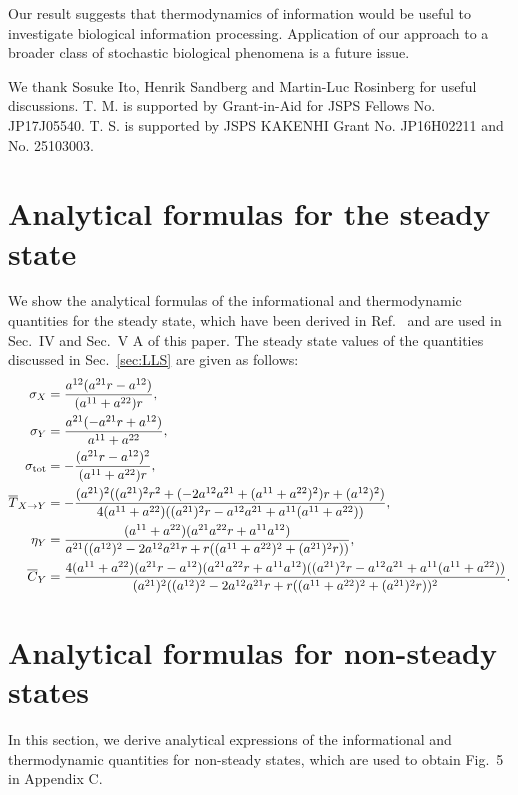 \documentclass[%
 reprint,
 amsmath,amssymb,
 aps,
]{revtex4-1}
\newcommand{\balign}[1]{\begin{align} #1 \end{align}}
\newcommand\str{\overline{T}_{X\to Y}}
\theoremstyle{plain}
\begin{document}
Our result suggests that thermodynamics of information would be useful to investigate biological information processing.  Application of our approach to a broader class of stochastic biological phenomena is a future issue.

\begin{acknowledgments}
We thank Sosuke Ito, Henrik Sandberg and Martin-Luc Rosinberg for useful discussions. T. M. is supported by Grant-in-Aid for JSPS Fellows No. JP17J05540. T. S. is supported by JSPS KAKENHI Grant No. JP16H02211 and No. 25103003.  

\end{acknowledgments}

\appendix


\section{Analytical formulas for the steady state}\label{sec:Sm}
\begin{widetext}
We show the analytical formulas of the informational and thermodynamic quantities for the steady state, which have been derived in Ref.~\cite{Hartich2016} and are used in Sec.~IV and Sec.~V A of this paper. The steady state values of the quantities discussed in Sec.~\ref{sec:LLS} are given as follows:
\balign{
\sigma_{X}&=\frac{a^{12}(a^{21} r-a^{12})}{(a^{11}+a^{22})r}, \label{eq:sigmaxr}\\
\sigma_{Y}&=\frac{a^{21}(-a^{21}r+a^{12})}{a^{11}+a^{22}}, \label{eq:sigmayr}\\
\sigma_{\rm tot}&=-\frac{(a^{21}r-a^{12})^2}{(a^{11}+a^{22})r}, \label{eq:sigmatr}\\
\str&=-\frac{(a^{21})^2((a^{21})^2r^2+(-2a^{12}a^{21}+(a^{11}+a^{22})^2)r+(a^{12})^2)}{4(a^{11}+a^{22})((a^{21})^2r-a^{12}a^{21}+a^{11}(a^{11}+a^{22}))}, \label{eq:strdesu}\\
\eta_{Y}&=\frac{(a^{11}+a^{22})(a^{21}a^{22}r+a^{11}a^{12})}{a^{21}((a^{12})^2-2a^{12}a^{21}r+r((a^{11}+a^{22})^2+(a^{21})^2r))},\label{eq:etayr}\\
\overline{C}_Y&=\frac{4(a^{11}+a^{22})(a^{21}r-a^{12})(a^{21}a^{22}r+a^{11}a^{12})((a^{21})^2 r-a^{12}a^{21}+a^{11}(a^{11}+a^{22}))}{(a^{21})^2((a^{12})^2-2a^{12}a^{21}r+r((a^{11}+a^{22})^2+(a^{21})^2 r))^2}. \label{eq:Cr}
}
\end{widetext}

\section{Analytical formulas for non-steady states}
In this section, we derive analytical expressions of the informational and thermodynamic quantities for non-steady states, which are used to obtain Fig.~5 in Appendix C. 
\end{document}
